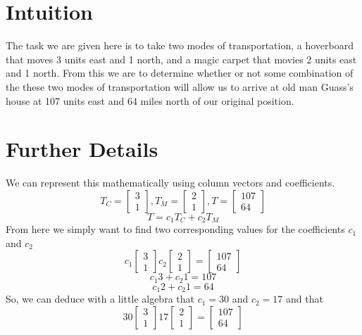 \documentclass{article}
\begin{document}
\section{Intuition}
The task we are given here is to take two modes of transportation, a hoverboard that moves
3 units east and 1 north, and a magic carpet that movies 2 units east and 1 north.
From this we are to determine whether or not some combination of the these two
modes of transportation will allow us to arrive at old man Guass's house at
107 units east and 64 miles north of our original position.
\section{Further Details}
We can represent this mathematically using column vectors and coefficients.
\[
T_C = \begin{bmatrix}
3 \\ 1 
\end{bmatrix}
,
T_M = \begin{bmatrix}
2 \\ 1
\end{bmatrix}
,
T = \begin{bmatrix}
107 \\ 64
\end{bmatrix}
\]
\[
T = {c_1}{T_C}+{c_2}{T_M}
\]
From here we simply want to find two corresponding values for the 
coefficients ${c_1}$ and ${c_2}$
\[
{c_1}
\begin{bmatrix}
3 \\ 1 
\end{bmatrix}
{c_2}
\begin{bmatrix}
2 \\ 1
\end{bmatrix}
=
\begin{bmatrix}
107 \\ 64
\end{bmatrix}
\]
\[{c_1}3+{c_2}1=107\]
\[{c_1}2+{c_2}1=64\]
So, we can deduce with a little algebra that ${c_1}=30$ and ${c_2}=17$ and that
\[
30
\begin{bmatrix}
3 \\ 1 
\end{bmatrix}
17
\begin{bmatrix}
2 \\ 1
\end{bmatrix}
=
\begin{bmatrix}
107 \\ 64
\end{bmatrix}
\]
\end{document}
